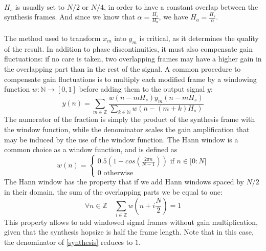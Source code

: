 \documentclass[letterpaper]{article}
\theoremstyle{definition}
\theoremstyle{remark}
\begin{document}
\paragraph{}
\(H_s\) is usually set to \(N/2\) or \(N/4\), in order to have a constant
overlap between the synthesis frames. And since we know that
\(\alpha=\frac{H_s}{H_a}\), we have \(H_a=\frac{H_s}{\alpha}\).

\paragraph{}
The method used to transform \(x_m\) into \(y_m\) is critical, as it determines
the quality of the result. In addition to phase discontinuities, it must also
compensate gain fluctuations: if no care is taken, two overlapping frames may
have a higher gain in the overlapping part than in the rest of the signal.
A common procedure to compensate gain fluctuations is to multiply each modified
frame by a windowing function \(w:\mathbb{N}\to[0,1]\) before adding them to the
output signal \(y\):
\begin{equation}
	\label{synthesis}
	y(n) = \sum_{m\in\mathbb{Z}}
	\frac{w(n-mH_s)y_m(n-mH_s)}
	{\sum_{k\in\mathbb{N}}w(n-(m + k)H_s)}
\end{equation}
The numerator of the fraction is simply the product of the synthesis frame with
the window function, while the denominator scales the gain amplification that
may be induced by the use of the window function. The Hann window is a common
choice as a window function, and is defined as
\begin{equation}
\label{hann}
w(n)=\begin{cases}
	0.5(1-cos(\frac{2\pi n}{N-1}))\text{ if }n\in[0:N[\\
	0 \text{ otherwise}\end{cases}
\end{equation}
The Hann window has the property that if we add Hann windows spaced by \(N/2\)
in their domain, the sum of the overlapping parts we be equal to one:
\begin{equation}
	\forall n\in\mathbb{Z}\quad\sum_{i\in\mathbb{Z}}w(n + i\frac{N}{2}) = 1
\end{equation}
This property allows to add windowed signal frames without gain multiplication,
given that the synthesis hopsize is half the frame length. Note that in this
case, the denominator of \eqref{synthesis} reduces to \(1\).
\end{document}
